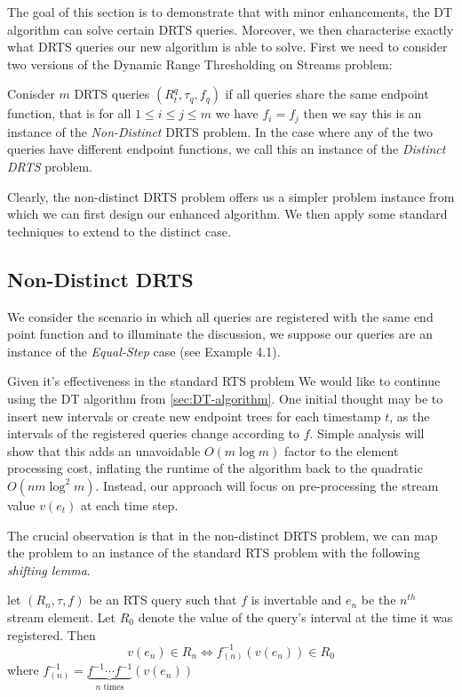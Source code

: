The goal of this section is to demonstrate that with minor enhancements, the DT algorithm can solve certain DRTS queries. Moreover, we then characterise exactly what DRTS queries our new algorithm is able to solve. First we need to consider two versions of the Dynamic Range Thresholding on Streams problem: 

\begin{definition}
    Conisder $m$ DRTS queries $(R_{t}^q, \tau_q, f_q)$ if all queries share the same endpoint function, that is for all $1\leq i\leq  j\leq m$ we have $f_i = f_j$ then we say this is an instance of the \textit{Non-Distinct} DRTS problem. In the case where any of the two queries have different endpoint functions, we call this an instance of the \textit{Distinct DRTS} problem.
\end{definition}

Clearly, the non-distinct DRTS problem offers us a simpler problem instance from which we can first design our enhanced algorithm. We then apply some standard techniques to extend to the distinct case. 

\subsection{Non-Distinct DRTS}
\label{ssec:non-distinct-rts}

We consider the scenario in which all queries are registered with the same end point function and to illuminate the discussion, we suppose our queries are an instance of the \textit{Equal-Step} case (see Example 4.1). 

Given it's effectiveness in the standard RTS problem We would like to continue using the DT algorithm from \cref{sec:DT-algorithm}. One initial thought may be to insert new intervals or create new endpoint trees for each timestamp $t$, as the intervals of the registered queries change according to $f$. Simple analysis will show that this adds an unavoidable $O(m\log m)$ factor to the element processing cost, inflating the runtime of the algorithm back to the quadratic $O(nm\log^2 m)$. Instead, our approach will focus on pre-processing the stream value $v(e_t)$ at each time step. 

The crucial observation is that in the non-distinct DRTS problem, we can map the problem to an instance of the standard RTS problem with the following \textit{shifting lemma}. 

\begin{lemma}
    let $(R_n, \tau, f)$ be an RTS query such that $f$ is invertable and $e_n$ be the $n^{th}$ stream element. Let $R_0$ denote the value of the query's interval at the time it was registered. Then 
    $$v(e_n) \in R_n \iff f^{-1}_{(n)}(v(e_n))\in R_0$$
    where $f^{-1}_{(n)} = \underbrace{f^{-1}\cdots f^{-1}}_{n \text{ times}}(v(e_n))$
\end{lemma}

